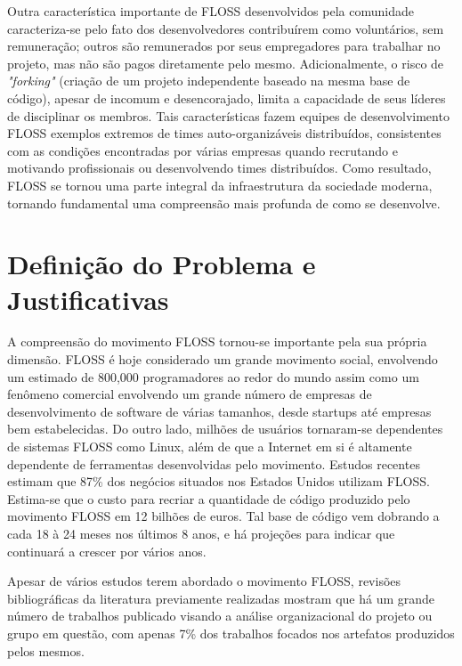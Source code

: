 Outra característica importante de FLOSS desenvolvidos pela comunidade caracteriza-se pelo fato dos desenvolvedores contribuírem como voluntários, sem remuneração; outros são remunerados por seus empregadores para trabalhar no projeto, mas não são pagos diretamente pelo mesmo. Adicionalmente, o risco de \textit{"forking"} (criação de um projeto independente baseado na mesma base de código), apesar de incomum e desencorajado, limita a capacidade de seus líderes de disciplinar os membros. Tais características fazem equipes de desenvolvimento FLOSS exemplos extremos de times auto-organizáveis distribuídos, consistentes com as condições encontradas por várias empresas quando recrutando e motivando profissionais ou desenvolvendo times distribuídos.
Como resultado, FLOSS se tornou uma parte integral da infraestrutura da sociedade moderna, tornando fundamental uma compreensão mais profunda de como se desenvolve.




\section{Definição do Problema e Justificativas}

A compreensão do movimento FLOSS tornou-se importante pela sua própria dimensão\cite{crowston2012free}. FLOSS é hoje considerado um grande movimento social, envolvendo um estimado de 800,000 programadores ao redor do mundo assim como um fenômeno comercial envolvendo um grande número de empresas de desenvolvimento de software de várias tamanhos, desde startups até empresas bem estabelecidas. Do outro lado, milhões  de usuários tornaram-se dependentes de sistemas FLOSS como Linux, além de que a Internet em si é altamente dependente de ferramentas desenvolvidas pelo movimento. Estudos recentes estimam que 87\% dos negócios situados nos Estados Unidos utilizam FLOSS. Estima-se que o custo para recriar a quantidade de código produzido pelo movimento FLOSS em 12 bilhões de euros. Tal base de código vem dobrando a cada 18 à 24 meses nos últimos 8 anos, e há projeções para indicar que continuará a crescer por vários anos\cite{ghosh2007economic}. 

Apesar de vários estudos terem abordado o movimento FLOSS, revisões bibliográficas da literatura previamente realizadas\cite{crowston2012free} mostram que 
há um grande número de trabalhos publicado visando a análise organizacional do projeto ou grupo em questão, com apenas 7\% dos trabalhos focados nos artefatos produzidos pelos mesmos. 

